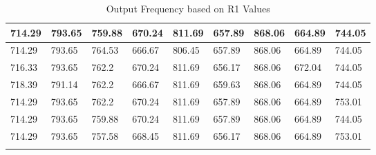 \begin{longtable}{|l|l|l|l|l|l|l|l|l|}
		714.29   & 793.65  & 759.88  & 670.24  & 811.69 & 657.89  & 868.06   & 664.89  & 744.05  \\ \hline
		714.29   & 793.65  & 764.53  & 666.67  & 806.45 & 657.89  & 868.06   & 664.89  & 744.05  \\ \hline
		716.33   & 793.65  & 762.2   & 670.24  & 811.69 & 656.17  & 868.06   & 672.04  & 744.05  \\ \hline
		718.39   & 791.14  & 762.2   & 666.67  & 811.69 & 659.63  & 868.06   & 664.89  & 744.05  \\ \hline
		714.29   & 793.65  & 762.2   & 670.24  & 811.69 & 657.89  & 868.06   & 664.89  & 753.01  \\ \hline
		714.29   & 793.65  & 759.88  & 670.24  & 811.69 & 657.89  & 868.06   & 664.89  & 744.05  \\ \hline
		714.29   & 793.65  & 757.58  & 668.45  & 811.69 & 656.17  & 868.06   & 664.89  & 753.01  \\ \hline
		\caption{Output Frequency based on R1 Values}		\label{calibrationtable1}
	\end{longtable}
	
	
	

